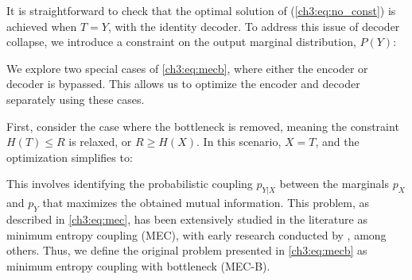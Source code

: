 It is straightforward to check that the optimal solution of (\ref{ch3:eq:no_const}) is achieved when $T=Y$, with the identity decoder. To address this issue of decoder collapse, we introduce a constraint on the output marginal distribution, $P(Y)$:


We explore two special cases of \eqref{ch3:eq:mecb}, where either the encoder or decoder is bypassed. This allows us to optimize the encoder and decoder separately using these cases.

First, consider the case where the bottleneck is removed, meaning the constraint $H(T) \leq R$ is relaxed, or $R \geq H(X)$. In this scenario, $X=T$, and the optimization simplifies to:


This involves identifying the probabilistic coupling $p_{Y|X}$ between the marginals $p_X$ and $p_Y$ that maximizes the obtained mutual information. 
This problem, as described in \eqref{ch3:eq:mec}, has been extensively studied in the literature as minimum entropy coupling (MEC), with early research conducted by \cite{vidyasagar2012metric, painsky2013memoryless, kovavcevic2015entropy, cicalese2017find}, among others.
Thus, we define the original problem presented in \eqref{ch3:eq:mecb} as minimum entropy coupling with bottleneck (MEC-B).

